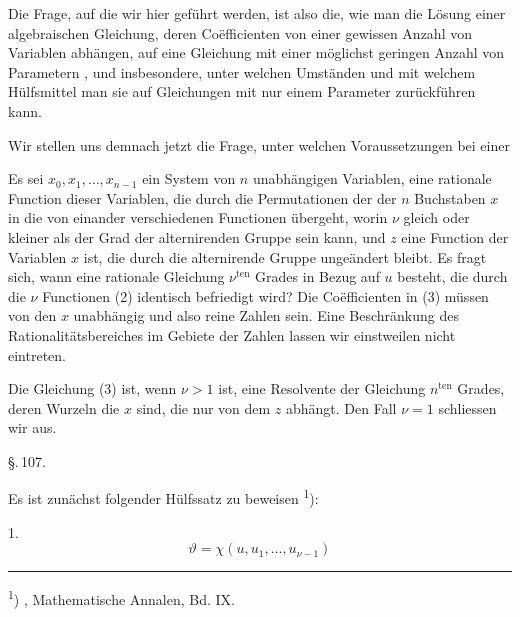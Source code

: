 
Die Frage, auf die wir hier gef\"uhrt werden, ist also die, wie
man die L\"osung einer algebraischen Gleichung, deren Co\"efficienten
 von einer gewissen Anzahl von Variablen abh\"angen, auf
eine Gleichung mit einer m\"oglichst geringen Anzahl von Parametern
, und insbesondere, unter welchen Umst\"anden und mit
welchem H\"ulfsmittel man sie auf Gleichungen mit nur einem
Parameter zur\"uckf\"uhren kann.

Wir stellen uns demnach jetzt die Frage, unter welchen
Voraussetzungen bei einer 

Es sei $x_0, x_1, \ldots, x_{n-1}$ ein System von $n$ unabh\"angigen Variablen,
eine rationale Function dieser Variablen, die durch die Permutationen
 der  der $n$ Buchstaben $x$ in die
von einander verschiedenen Functionen
\"ubergeht, worin $\nu$ gleich oder kleiner als der Grad der alternirenden
 Gruppe sein kann, und $z$ eine Function der Variablen $x$
ist, die durch die alternirende Gruppe unge\"andert bleibt. Es
fragt sich, wann eine rationale Gleichung $\nu^{\text{ten}}$ Grades in Bezug
auf $u$ besteht,
die durch die $\nu$ Functionen (2) identisch befriedigt wird? Die
Co\"efficienten in (3) m\"ussen von den $x$ unabh\"angig und also reine
Zahlen sein. Eine Beschr\"ankung des Rationalit\"atsbereiches im
Gebiete der Zahlen lassen wir einstweilen nicht eintreten.

Die Gleichung (3) ist, wenn $\nu > 1$ ist, eine Resolvente der
Gleichung $n^{\text{ten}}$ Grades, deren Wurzeln die $x$ sind, die nur von dem
 $z$ abh\"angt. Den Fall $\nu = 1$ schliessen wir aus.

\begin{center}
\S.\,107.

\end{center}

Es ist zun\"achst folgender H\"ulfssatz zu beweisen \textsuperscript{1}):

1. 
\[
\vartheta = \chi(u, u_1, \ldots, u_{\nu-1})
\]

\begin{center}
\rule{0.3\linewidth}{0.4pt}
\end{center}

\textsuperscript{1}) , Mathematische Annalen, Bd. IX.
